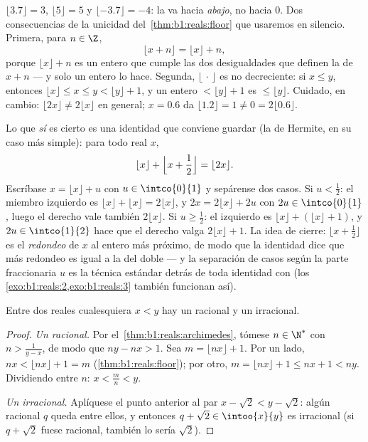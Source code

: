 \begin{example}\label{ex:b1:reals:floorpractice}
$\lfloor 3.7 \rfloor = 3$, $\lfloor 5 \rfloor = 5$ y
$\lfloor -3.7 \rfloor = -4$: la  va hacia \emph{abajo},
no hacia $0$. Dos consecuencias de la unicidad
del~\cref{thm:b1:reals:floor} que usaremos en silencio. Primera, para
$n \in \Z$,
\[
\lfloor x + n \rfloor = \lfloor x \rfloor + n ,
\]
porque $\lfloor x \rfloor + n$ es un entero que cumple las dos
desigualdades que definen la de $x + n$ --- y solo un entero lo hace.
Segunda, $\lfloor \, \cdot \, \rfloor$ es no decreciente: si
$x \leq y$, entonces $\lfloor x \rfloor \leq x \leq y < \lfloor y
\rfloor + 1$, y un entero $< \lfloor y \rfloor + 1$ es
$\leq \lfloor y \rfloor$. Cuidado, en cambio: $\lfloor 2x \rfloor \neq
2\lfloor x \rfloor$ en general; $x = 0.6$ da $\lfloor 1.2 \rfloor = 1
\neq 0 = 2\lfloor 0.6 \rfloor$.

Lo que \emph{sí} es cierto es una identidad que conviene guardar (la de
Hermite, en su caso más simple): para todo real $x$,
\[
\lfloor x \rfloor + \Bigl\lfloor x + \frac12 \Bigr\rfloor
= \lfloor 2x \rfloor .
\]
Escríbase $x = \lfloor x\rfloor + u$ con $u \in \intco{0}{1}$ y
sepárense dos casos. Si $u < \frac12$: el miembro izquierdo es
$\lfloor x\rfloor + \lfloor x\rfloor = 2\lfloor x\rfloor$, y
$2x = 2\lfloor x\rfloor + 2u$ con $2u \in \intco{0}{1}$, luego el
derecho vale también $2\lfloor x\rfloor$. Si $u \geq \frac12$: el
izquierdo es $\lfloor x\rfloor + (\lfloor x\rfloor + 1)$, y
$2u \in \intco{1}{2}$ hace que el derecho valga
$2\lfloor x\rfloor + 1$. La idea de cierre:
$\lfloor x + \frac12\rfloor$ es el \emph{redondeo} de $x$ al entero
más próximo, de modo que la identidad dice que  más
redondeo es igual a la  del doble --- y la separación de
casos según la parte fraccionaria $u$ es la técnica estándar detrás de
toda identidad con  (los
\cref{exo:b1:reals:2,exo:b1:reals:3} también funcionan así).
\end{example}

\begin{theorem}\label{thm:b1:reals:density}
Entre dos reales cualesquiera $x < y$ hay un racional y un
irracional.
\end{theorem}

\begin{proof}
\emph{Un racional.} Por el~\cref{thm:b1:reals:archimedes}, tómese
$n \in \N^*$ con $n > \frac{1}{y - x}$, de modo que $ny - nx > 1$. Sea
$m = \lfloor nx \rfloor + 1$. Por un lado,
$nx < \lfloor nx \rfloor + 1 = m$ (\cref{thm:b1:reals:floor}); por
otro, $m = \lfloor nx \rfloor + 1 \leq nx + 1 < ny$. Dividiendo entre
$n$: $x < \frac mn < y$.

\emph{Un irracional.} Aplíquese el punto anterior al par
$x - \sqrt 2 < y - \sqrt 2$: algún racional $q$ queda entre ellos, y
entonces $q + \sqrt 2 \in \intoo{x}{y}$ es irracional (si
$q + \sqrt 2$ fuese racional, también lo sería $\sqrt 2$).
\end{proof}

